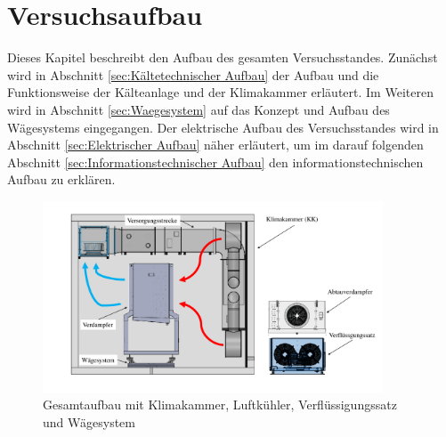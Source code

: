 \chapter{Versuchsaufbau}
\label{cha: Versuchsaufbau}

Dieses Kapitel beschreibt den Aufbau des gesamten Versuchsstandes. Zunächst wird in Abschnitt \ref{sec:Kältetechnischer Aufbau} der Aufbau und die Funktionsweise der Kälteanlage und der Klimakammer erläutert. Im Weiteren wird in Abschnitt \ref{sec:Waegesystem} auf das Konzept und Aufbau des Wägesystems eingegangen. 
Der elektrische Aufbau des Versuchsstandes wird in Abschnitt \ref{sec:Elektrischer Aufbau} näher erläutert, um im darauf folgenden Abschnitt \ref{sec:Informationstechnischer Aufbau} den informationstechnischen Aufbau zu erklären. 


\begin{figure}[htb]
\centering		\includegraphics[page=1,width=0.90\textwidth]{Pictures/Versuchsaufbau/GesAufbau.pdf}
\caption{Gesamtaufbau mit Klimakammer, Luftkühler, Verflüssigungssatz und Wägesystem}
\label{fig:GesAufbau}
\end{figure}







\newpage

